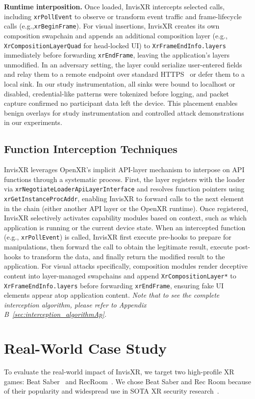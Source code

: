 \documentclass[letterpaper,twocolumn,10pt]{article}
\begin{document}
\noindent\textbf{Runtime interposition.} Once loaded, InvisXR intercepts selected calls, including \texttt{xrPollEvent} to observe or transform event traffic and frame-lifecycle calls (e.g.,\texttt{xrBeginFrame}). For visual insertions, InvisXR creates its own composition swapchain and appends an additional composition layer (e.g., \texttt{XrCompositionLayerQuad} for head-locked UI) to \texttt{XrFrameEndInfo.layers} immediately before forwarding \texttt{xrEndFrame}, leaving the application's layers unmodified. In an adversary setting, the layer could serialize user-entered fields and relay them to a remote endpoint over standard HTTPS~\cite{microsoftWinHTTP} or defer them to a local sink. In our study instrumentation, all sinks were bound to localhost or disabled, credential-like patterns were tokenized before logging, and packet capture confirmed no participant data left the device. This placement enables benign overlays for study instrumentation and controlled attack demonstrations in our experiments.

\subsection{Function Interception Techniques}
\label{sec:interception_algorithm}
InvisXR leverages OpenXR's implicit API-layer mechanism to interpose on API functions through a systematic process. First, the layer registers with the loader via \texttt{xrNegotiateLoaderApiLayerInterface} and resolves function pointers using \texttt{xrGetInstanceProcAddr}, enabling InvisXR to forward calls to the next element in the chain (either another API layer or the OpenXR runtime). Once registered, InvisXR selectively activates capability modules based on context, such as which application is running or the current device state. When an intercepted function (e.g., \texttt{xrPollEvent}) is called, InvisXR first execute pre-hooks to prepare for manipulations, then forward the call to obtain the legitimate result, execute post-hooks to transform the data, and finally return the modified result to the application. For visual attacks specifically, composition modules render deceptive content into layer-managed swapchains and append \texttt{XrCompositionLayer*} to \texttt{XrFrameEndInfo.layers} before forwarding \texttt{xrEndFrame}, ensuring fake UI elements appear atop application content. \textit{Note that to see the complete interception algorithm, please refer to Appendix B~\ref{sec:interception_algorithmAp}.}


\section{Real-World Case Study}
\label{sec:Real_world}
To evaluate the real-world impact of InvisXR, we target two high-profile XR games:  Beat Saber~\cite{BeatSaber} and RecRoom~\cite{recroom_steam}. We chose Beat Saber and Rec Room because of their popularity and widespread use in SOTA XR security research~\cite{nair2023unique, su2024remote, nair2023going, blackwell2019harassment, nair2024deep, nair2023truth, yarramreddy2018forensic, zhuk2024ethical, deldari2023investigation}. 
\end{document}
